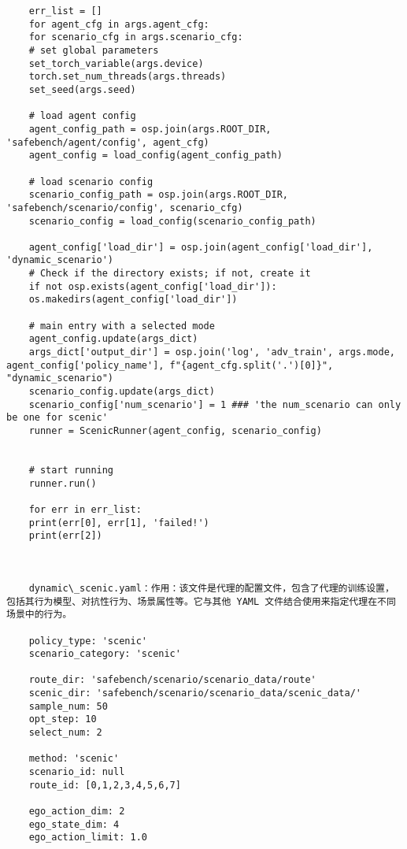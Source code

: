 \begin{lstlisting}
	err_list = []
	for agent_cfg in args.agent_cfg:
	for scenario_cfg in args.scenario_cfg:
	# set global parameters
	set_torch_variable(args.device)
	torch.set_num_threads(args.threads)
	set_seed(args.seed)
	
	# load agent config
	agent_config_path = osp.join(args.ROOT_DIR, 'safebench/agent/config', agent_cfg)
	agent_config = load_config(agent_config_path)
	
	# load scenario config
	scenario_config_path = osp.join(args.ROOT_DIR, 'safebench/scenario/config', scenario_cfg)
	scenario_config = load_config(scenario_config_path)
	
	agent_config['load_dir'] = osp.join(agent_config['load_dir'], 'dynamic_scenario')
	# Check if the directory exists; if not, create it
	if not osp.exists(agent_config['load_dir']):
	os.makedirs(agent_config['load_dir'])        
	
	# main entry with a selected mode
	agent_config.update(args_dict)
	args_dict['output_dir'] = osp.join('log', 'adv_train', args.mode, agent_config['policy_name'], f"{agent_cfg.split('.')[0]}", "dynamic_scenario")
	scenario_config.update(args_dict)
	scenario_config['num_scenario'] = 1 ### 'the num_scenario can only be one for scenic'
	runner = ScenicRunner(agent_config, scenario_config)
	
	
	# start running
	runner.run()
	
	for err in err_list:
	print(err[0], err[1], 'failed!')
	print(err[2])
	
	
	
	dynamic\_scenic.yaml：作用：该文件是代理的配置文件，包含了代理的训练设置，包括其行为模型、对抗性行为、场景属性等。它与其他 YAML 文件结合使用来指定代理在不同场景中的行为。
	
	policy_type: 'scenic'
	scenario_category: 'scenic'
	
	route_dir: 'safebench/scenario/scenario_data/route'
	scenic_dir: 'safebench/scenario/scenario_data/scenic_data/'
	sample_num: 50
	opt_step: 10
	select_num: 2
	
	method: 'scenic'
	scenario_id: null
	route_id: [0,1,2,3,4,5,6,7]
	
	ego_action_dim: 2
	ego_state_dim: 4
	ego_action_limit: 1.0
	
	
\end{lstlisting}


